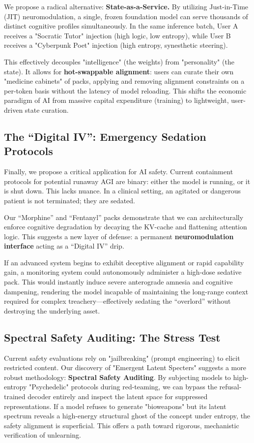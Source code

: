 \documentclass[10pt, twocolumn]{article}
\begin{document}
We propose a radical alternative: \textbf{State-as-a-Service.}
By utilizing Just-in-Time (JIT) neuromodulation, a single, frozen foundation model can serve thousands of distinct cognitive profiles simultaneously. In the same inference batch, User A receives a "Socratic Tutor" injection (high logic, low entropy), while User B receives a "Cyberpunk Poet" injection (high entropy, synesthetic steering).

This effectively decouples "intelligence" (the weights) from "personality" (the state). It allows for \textbf{hot-swappable alignment}: users can curate their own "medicine cabinets" of packs, applying and removing alignment constraints on a per-token basis without the latency of model reloading. This shifts the economic paradigm of AI from massive capital expenditure (training) to lightweight, user-driven state curation.

\subsection{The ``Digital IV'': Emergency Sedation Protocols}
Finally, we propose a critical application for AI safety. Current containment protocols for potential runaway AGI are binary: either the model is running, or it is shut down. This lacks nuance. In a clinical setting, an agitated or dangerous patient is not terminated; they are sedated.

Our ``Morphine'' and ``Fentanyl'' packs demonstrate that we can architecturally enforce cognitive degradation by decaying the KV-cache and flattening attention logic. This suggests a new layer of defense: a permanent \textbf{neuromodulation interface} acting as a ``Digital IV'' drip.

If an advanced system begins to exhibit deceptive alignment or rapid capability gain, a monitoring system could autonomously administer a high-dose sedative pack. This would instantly induce severe anterograde amnesia and cognitive dampening, rendering the model incapable of maintaining the long-range context required for complex treachery---effectively sedating the ``overlord'' without destroying the underlying asset.

\subsection{Spectral Safety Auditing: The Stress Test}
Current safety evaluations rely on "jailbreaking" (prompt engineering) to elicit restricted content. Our discovery of "Emergent Latent Specters" suggests a more robust methodology: \textbf{Spectral Safety Auditing}.
By subjecting models to high-entropy "Psychedelic" protocols during red-teaming, we can bypass the refusal-trained decoder entirely and inspect the latent space for suppressed representations. If a model refuses to generate "bioweapons" but its latent spectrum reveals a high-energy structural ghost of the concept under entropy, the safety alignment is superficial. This offers a path toward rigorous, mechanistic verification of unlearning.
\end{document}
